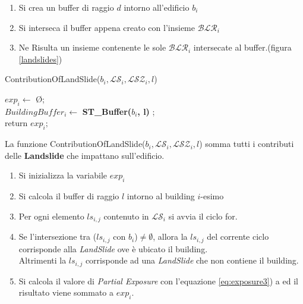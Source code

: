 \begin{enumerate}
	\item Si crea un buffer di raggio $d$ intorno all'edificio $b_i$
	\item Si interseca il buffer appena creato con l'insieme  $\mathcal{BLR}_i$
	\item Ne Risulta un insieme contenente le sole $\mathcal{BLR}_i$ intersecate al buffer.(figura \ref{landslides}) 
\end{enumerate}

\begin{algorithm}[H]
	
	\IncMargin{1em}
	\caption{ContributionOfLandSlide($b_i , \mathcal{LS}_i, \mathcal{LSZ}_i, l $) }
	\label{alg:four}
	\BlankLine
	\SetAlgoNoLine
	
	$ exp_i \leftarrow$ \O ;\\
	$ BuildingBuffer_i  \leftarrow $ \textbf{ST\_Buffer($b_i$, l)} ;\\
	return $exp_i;$
\end{algorithm}
La funzione ContributionOfLandSlide($b_i , \mathcal{LS}_i, \mathcal{LSZ}_i, l $) somma tutti i contributi delle \textbf{Landslide} che impattano sull'edificio.
\begin{enumerate}
	\item Si inizializza la variabile $exp_i$ 
	\item Si calcola il buffer di raggio $l$ intorno al building $i$-esimo
	\item Per ogni elemento $ls_{i,j}$ contenuto in $\mathcal{LS}_i $ si avvia il ciclo for.
	\item Se l'intersezione tra ($ls_{i,j}$ con $b_i$)$\not=\emptyset$, allora la $ls_{i,j}$ del corrente ciclo corrisponde alla	\textit{LandSlide} ove è ubicato il building.\\
	Altrimenti la $ls_{i,j}$ corrisponde ad una \textit{LandSlide} che non contiene il building. 
	\item Si calcola il valore di \textit{Partial Exposure} con l'equazione \ref{eq:exposure3}) a ed il risultato viene sommato a $exp_i$.
\end{enumerate}
